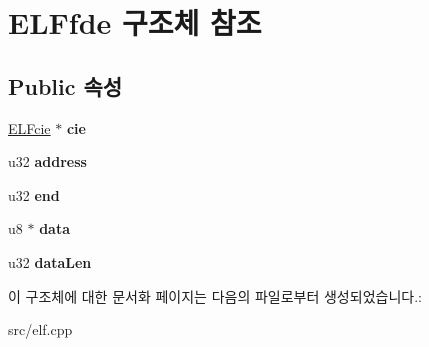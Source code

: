 \hypertarget{struct_e_l_ffde}{}\section{E\+L\+Ffde 구조체 참조}
\label{struct_e_l_ffde}
\subsection*{Public 속성}
\begin{DoxyCompactItemize}
\item 
\mbox{\label{struct_e_l_ffde_a3ecfd81fe700bcaf54ea8dd4e573066c}} 
\mbox{\hyperlink{struct_e_l_fcie}{E\+L\+Fcie}} $\ast$ {\bfseries cie}
\item 
\mbox{\label{struct_e_l_ffde_a56f664c17014d326fde32fcf334b1f7c}} 
u32 {\bfseries address}
\item 
\mbox{\label{struct_e_l_ffde_a7adc7f88e82c38114747df8361ba3c05}} 
u32 {\bfseries end}
\item 
\mbox{\label{struct_e_l_ffde_a62e2ad316aaa29267516226b6e8f1e24}} 
u8 $\ast$ {\bfseries data}
\item 
\mbox{\label{struct_e_l_ffde_a078548d5c62467613c4a8d57dbfb3396}} 
u32 {\bfseries data\+Len}
\end{DoxyCompactItemize}


이 구조체에 대한 문서화 페이지는 다음의 파일로부터 생성되었습니다.\+:\begin{DoxyCompactItemize}
\item 
src/elf.\+cpp\end{DoxyCompactItemize}
